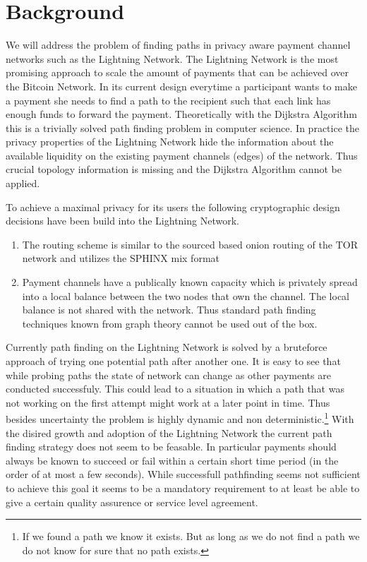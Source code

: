 \documentclass[a4paper]{paper}
\begin{document}
\section{Background}
We will address the problem of finding paths in privacy aware payment channel networks such as the Lightning Network.
The Lightning Network is the most promising approach to scale the amount of payments that can be achieved over the Bitcoin Network.
In its current design everytime a participant wants to make a payment she needs to find a path to the recipient such that each link has enough funds to forward the payment.
Theoretically with the Dijkstra Algorithm this is a trivially solved path finding problem in computer science.
In practice the privacy properties of the Lightning Network hide the information about the available liquidity on the existing payment channels (edges) of the network.
Thus crucial topology information is missing and the Dijkstra Algorithm cannot be applied.

To achieve a maximal privacy for its users the following cryptographic design decisions have been build into the Lightning Network.
\begin{enumerate}
\item The routing scheme is similar to the sourced based onion routing of the TOR network and utilizes the SPHINX mix format \cite{danezis2009sphinx}
\item Payment channels have a publically known capacity which is privately spread into a local balance between the two nodes that own the channel. The local balance is not shared with the network. Thus standard path finding techniques known from graph theory cannot be used out of the box.
\end{enumerate}

Currently path finding on the Lightning Network is solved by a bruteforce approach of trying one potential path after another one.
It is easy to see that while probing paths the state of network can change as other payments are conducted successfuly.
This could lead to a situation in which a path that was not working on the first attempt might work at a later point in time.
Thus besides uncertainty the problem is highly dynamic and non deterministic.\footnote{If we found a path we know it exists. But as long as we do not find a path we do not know for sure that no path exists.}
With the disired growth and adoption of the Lightning Network the current path finding strategy does not seem to be feasable.
In particular payments should always be known to succeed or fail within a certain short time period (in the order of at most a few seconds).
While successfull pathfinding seems not sufficient to achieve this goal it seems to be a mandatory requirement to at least be able to give a certain quality assurence or service level agreement.
\end{document}
